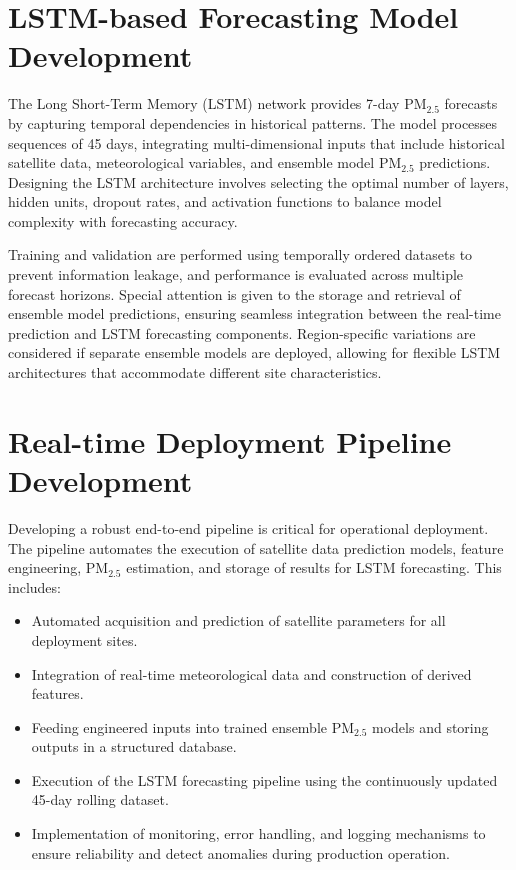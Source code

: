 \documentclass[12pt]{report}
\begin{document}
\section{LSTM-based Forecasting Model Development}

The Long Short-Term Memory (LSTM) network provides 7-day PM$_{2.5}$ forecasts by capturing temporal dependencies in historical patterns. The model processes sequences of 45 days, integrating multi-dimensional inputs that include historical satellite data, meteorological variables, and ensemble model PM$_{2.5}$ predictions. Designing the LSTM architecture involves selecting the optimal number of layers, hidden units, dropout rates, and activation functions to balance model complexity with forecasting accuracy.  

Training and validation are performed using temporally ordered datasets to prevent information leakage, and performance is evaluated across multiple forecast horizons. Special attention is given to the storage and retrieval of ensemble model predictions, ensuring seamless integration between the real-time prediction and LSTM forecasting components. Region-specific variations are considered if separate ensemble models are deployed, allowing for flexible LSTM architectures that accommodate different site characteristics.

\section{Real-time Deployment Pipeline Development}

Developing a robust end-to-end pipeline is critical for operational deployment. The pipeline automates the execution of satellite data prediction models, feature engineering, PM$_{2.5}$ estimation, and storage of results for LSTM forecasting. This includes:

\begin{itemize}
    \item Automated acquisition and prediction of satellite parameters for all deployment sites.
    \item Integration of real-time meteorological data and construction of derived features.
    \item Feeding engineered inputs into trained ensemble PM$_{2.5}$ models and storing outputs in a structured database.
    \item Execution of the LSTM forecasting pipeline using the continuously updated 45-day rolling dataset.
    \item Implementation of monitoring, error handling, and logging mechanisms to ensure reliability and detect anomalies during production operation.
\end{itemize}
\end{document}
